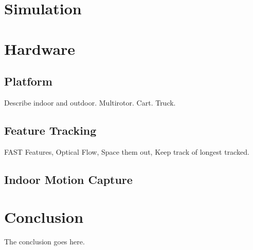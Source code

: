 \documentclass[journal,onecolumn]{IEEEtran}
\begin{document}
\section{Simulation} \label{sec:simulation}


\section{Hardware} \label{sec:hardware}

\subsection{Platform}
Describe indoor and outdoor. Multirotor. Cart. Truck.

\subsection{Feature Tracking}
FAST Features, Optical Flow, Space them out, Keep track of longest tracked.

\subsection{Indoor Motion Capture}

\section{Conclusion}
The conclusion goes here.






\end{document}
